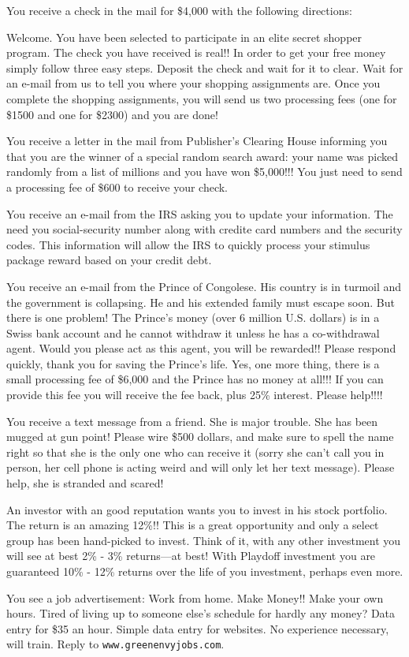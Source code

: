 \documentclass{article}
\begin{document}
\begin{exe}
\ex You receive a check in the mail for \$4,000 with the following directions:
\begin{xlist}
\ex Welcome. You have been selected to participate in an elite secret shopper program. The check you have received is real!! In order to get your free money simply follow three easy steps.
\ex Deposit the check and wait for it to clear.
\ex Wait for an e-mail from us to tell you where your shopping assignments are.
\ex Once you complete the shopping assignments, you will send us two processing fees (one for \$1500 and one for \$2300) and you are done!
\end{xlist}

\ex You receive a letter in the mail from Publisher's Clearing House informing you that you are the winner of a special random search award: your name was picked randomly from a list of millions and you have won \$5,000!!! You just need to send a processing fee of \$600 to receive your check.

\ex You receive an e-mail from the IRS asking you to update your information. The need you social-security number along with credite card numbers and the security codes. This information will allow the IRS to quickly process your stimulus package reward based on your credit debt.

\ex You receive an e-mail from the Prince of Congolese. His country is in turmoil and the government is collapsing. He and his extended family must escape soon. But there is one problem! The Prince's money (over 6 million U.S. dollars) is in a Swiss bank account and he cannot withdraw it unless he has a co-withdrawal agent. Would you please act as this agent, you will be rewarded!! Please respond quickly, thank you for saving the Prince's life. Yes, one more thing, there is a small processing fee of \$6,000 and the Prince has no money at all!!! If you can provide this fee you will receive the fee back, plus 25\% interest. Please help!!!!

\ex You receive a text message from a friend. She is major trouble. She has been mugged at gun point! Please wire \$500 dollars, and make sure to spell the name right so that she is the only one who can receive it (sorry she can't call you in person, her cell phone is acting weird and will only let her text message). Please help, she is stranded and scared! 

\ex An investor with an good reputation wants you to invest in his stock portfolio. The return is an amazing 12\%!! This is a great opportunity and only a select group has been hand-picked to invest. Think of it, with any other investment you will see at best 2\% - 3\% returns---at best! With Playdoff investment you are guaranteed 10\% - 12\% returns over the life of you investment, perhaps even more. 


\ex You see a job advertisement:
Work from home. Make Money!! Make your own hours. Tired of living up to someone else's schedule for hardly any money? Data entry for \$35 an hour. Simple data entry for websites. No experience necessary, will train. Reply to \texttt{www.greenenvyjobs.com}.
\end{exe}
\end{document}
